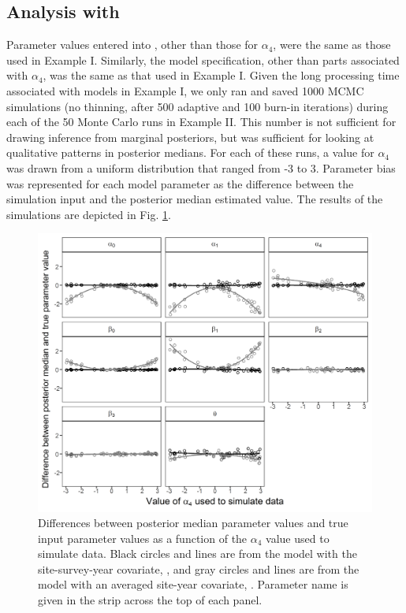 \documentclass[codesnippet]{jss}
\begin{document}
\subsection[Analysis with JAGS]{Analysis with }
Parameter values entered into , other than those for $\alpha_4$, were the same as those used in Example I.  Similarly, the  model specification, other than parts associated with $\alpha_4$, was the same as that used in Example I. Given the long processing time associated with  models in Example I, we only ran and saved 1000 MCMC simulations (no thinning, after 500 adaptive and 100 burn-in iterations) during each of the 50 Monte Carlo runs in Example II. This number is not sufficient for drawing inference from marginal posteriors, but was sufficient for looking at qualitative patterns in posterior medians. For each of these runs, a value for $\alpha_4$ was drawn from a uniform distribution that ranged from -3 to 3. Parameter bias was represented for each model parameter as the difference between the simulation input and the posterior median estimated value. The results of the simulations are depicted in Fig. \ref{fig:fig2}.

\begin{figure}
\includegraphics[width=\linewidth]{fig2.png}
\caption{Differences between posterior median parameter values and true input parameter values as a function of the $\alpha_4$ value used to simulate data. Black circles and lines are from the model with the site-survey-year covariate, , and gray circles and lines are from the model with an averaged site-year covariate, . Parameter name is given in the strip across the top of each panel.}
\label{fig:fig2}
\end{figure}
\end{document}
